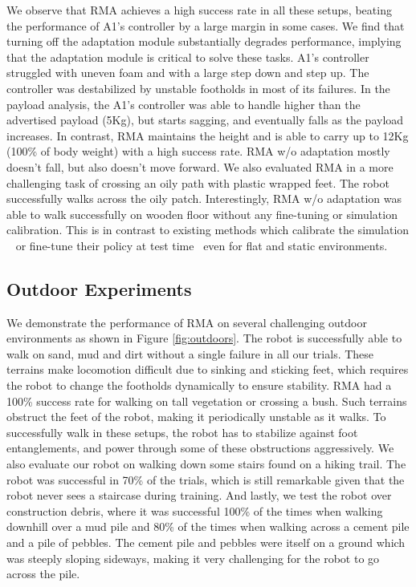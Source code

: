 \documentclass[conference]{IEEEtran}
\newcommand{\algo}{RMA}
\begin{document}
We observe that \algo{} achieves a high success rate in all these setups, beating the performance of A1's controller by a large margin in some cases. We find that turning off the adaptation module substantially degrades performance, implying that the adaptation module is critical to solve these tasks. A1's controller struggled with uneven foam and with a large step down and step up. The controller was destabilized by unstable footholds in most of its failures. In the payload analysis, the A1's controller was able to handle higher than the advertised payload (5Kg), but starts sagging, and eventually falls as the payload increases. In contrast, \algo{} maintains the height and is able to carry up to 12Kg (100\% of body weight) with a high success rate. \algo{} w/o adaptation mostly doesn't fall, but also doesn't move forward. We also evaluated \algo{} in a more challenging task of crossing an oily path with plastic wrapped feet. The robot successfully walks across the oily patch. Interestingly, \algo{} w/o adaptation was able to walk successfully on wooden floor without any fine-tuning or simulation calibration. This is in contrast to existing methods which calibrate the simulation ~\cite{tan2018sim, hwangbo2019learning} or fine-tune their policy at test time~\cite{peng2020learning} even for flat and static environments.

\subsection{Outdoor Experiments}
We demonstrate the performance of \algo{} on several challenging outdoor environments as shown in Figure \ref{fig:outdoors}. The robot is successfully able to walk on sand, mud and dirt without a single failure in all our trials. These terrains make locomotion difficult due to sinking and sticking feet, which requires the robot to change the footholds dynamically to ensure stability. \algo{} had a 100\% success rate for walking on tall vegetation or crossing a bush. Such terrains obstruct the feet of the robot, making it periodically unstable as it walks. To successfully walk in these setups, the robot has to stabilize against foot entanglements, and power through some of these obstructions aggressively. We also evaluate our robot on walking down some stairs found on a hiking trail. The robot was successful in 70\% of the trials, which is still remarkable given that the robot never sees a staircase during training. And lastly, we test the robot over construction debris, where it was successful 100\% of the times when walking downhill over a mud pile and 80\% of the times when walking across a cement pile and a pile of pebbles. The cement pile and pebbles were itself on a ground which was steeply sloping sideways, making it very challenging for the robot to go across the pile.
\end{document}

